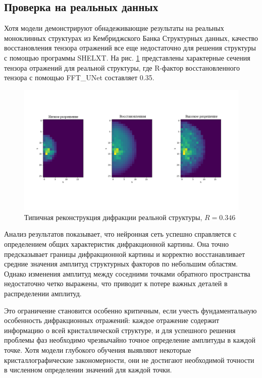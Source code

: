 \subsection{Проверка на реальных данных}

Хотя модели демонстрируют обнадеживающие результаты на реальных моноклинных структурах из Кембриджского Банка Структурных данных, качество восстановления тензора отражений все еще недостаточно для решения структуры с помощью программы SHELXT. На рис. \ref{recon_ex} представлены характерные сечения тензора отражений для реальной структуры, где R-фактор восстановленного тензора с помощью FFT\_UNet составляет 0.35.

\begin{figure}[H]
    \centering
    \includegraphics[width=1\textwidth]{figures/real.png}
    \caption{Типичная реконструкция дифракции реальной структуры, $R = 0.346$}
    \label{recon_ex}
\end{figure}

Анализ результатов показывает, что нейронная сеть успешно справляется с определением общих характеристик дифракционной картины. Она точно предсказывает границы дифракционной картины и корректно восстанавливает средние значения амплитуд структурных факторов по небольшим областям. Однако изменения амплитуд между соседними точками обратного пространства недостаточно четко выражены, что приводит к потере важных деталей в распределении амплитуд. 

Это ограничение становится особенно критичным, если учесть фундаментальную особенность дифракционных отражений: каждое отражение содержит информацию о всей кристаллической структуре, и для успешного решения проблемы фаз необходимо чрезвычайно точное определение амплитуды в каждой точке. Хотя модели глубокого обучения выявляют некоторые кристаллографические закономерности, они не достигают необходимой точности в численном определении значений для каждой точки.

